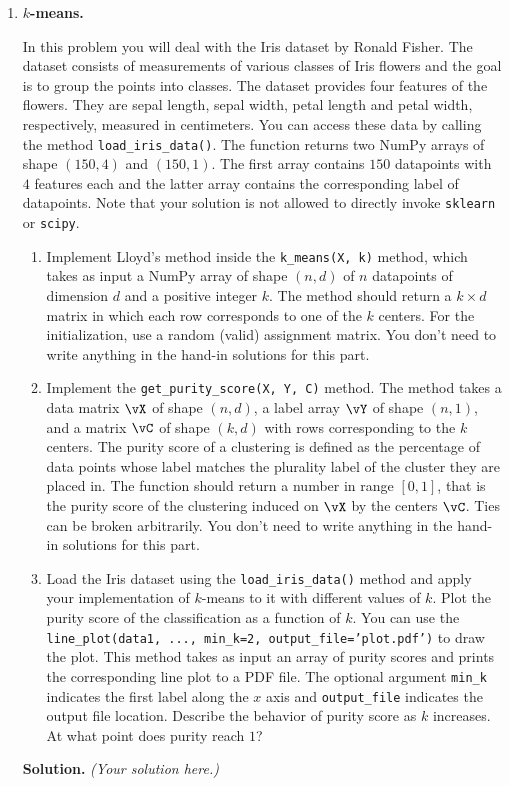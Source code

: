 \documentclass{article}
\theoremstyle{definition}
\theoremstyle{remark}
\newenvironment{Q}
{%
\clearpage
\item
}
{%
\phantom{s}
\bigskip
\textbf{Solution.}
\emph{(Your solution here.)}
}
\begin{document}
\begin{enumerate}
\begin{Q}
  \textbf{$k$-means.}

  In this problem you will deal with the Iris dataset by Ronald Fisher. The dataset consists of measurements of various classes of Iris flowers and the goal is to group the points into classes. The dataset provides four features of the flowers. They are sepal length, sepal width, petal length and petal width, respectively, measured in centimeters. You can access these data by calling the method \texttt{load\_iris\_data()}. The function returns two NumPy arrays of shape $(150,4)$ and $(150,1)$. The first array contains $150$ datapoints with $4$ features each and the latter array contains the corresponding label of datapoints. Note that your solution is not allowed to directly invoke \texttt{sklearn} or \texttt{scipy}.

  \begin{enumerate}
    \item
      Implement Lloyd's method inside the \texttt{k\_means(X, k)} method, which takes as input a NumPy array of shape $(n, d)$ of $n$ datapoints of dimension $d$ and a positive integer $k$. The method should return a $k \times d$ matrix in which each row corresponds to one of the $k$ centers.  For the initialization, use a random (valid) assignment matrix. You don't need to write anything in the hand-in solutions for this part.

    \item
      Implement the \texttt{get\_purity\_score(X, Y, C)} method. The method takes a data matrix $\vX$ of shape $(n,d)$, a label array $\vY$ of shape $(n,1)$, and a matrix $\vC$ of shape $(k,d)$ with rows corresponding to the $k$ centers. The purity score of a clustering is defined as the percentage of data points whose label matches the plurality label of the cluster they are placed in. The function should return a number in range $[0,1]$, that is the purity score of the clustering induced on $\vX$ by the centers $\vC$. Ties can be broken arbitrarily. You don't need to write anything in the hand-in solutions for this part.

    \item
      Load the Iris dataset using the \texttt{load\_iris\_data()} method and apply your implementation of $k$-means to it with different values of $k$. Plot the purity score of the classification as a function of $k$. You can use the \texttt{line\_plot(data1, ..., min\_k=2, output\_file='plot.pdf')} to draw the plot. This method takes as input an array of purity scores and prints the corresponding line plot to a PDF file. The optional argument \texttt{min\_k} indicates the first label along the $x$ axis and \texttt{output\_file} indicates the output file location. Describe the behavior of purity score as $k$ increases. At what point does purity reach $1$?


\end{enumerate}
\end{Q}
\end{enumerate}
\end{document}
